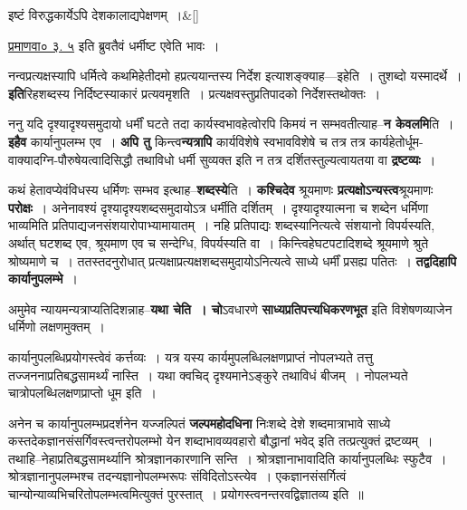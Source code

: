 \documentclass[article,12pt,a4paper]{memoir}
\begin{document}
	    
	    \stanza[\smallbreak]
	इष्टं विरुद्धकार्येऽपि देशकालाद्यपेक्षणम् ।\&[\smallbreak]


	
	    \pstart
	   \href{http://sarit.indology.info/?cref=pv.3.5}{प्रमाणवा० ३. ५} इति ब्रुवतैवं धर्मीष्ट एवेति भावः ।
	\pend
      

	  \pstart नन्वप्रत्यक्षस्यापि धर्मित्वे कथमिहेतीदमो हप्रत्ययान्तस्य निर्देश इत्याशङ्क्याह—इहेति । तुशब्दो यस्मादर्थे । \textbf{इति}रिहशब्दस्य निर्दिष्टस्याकारं प्रत्यवमृशति । प्रत्यक्षवस्तुप्रतिपादको निर्देशस्तथोक्तः ।
	\pend
      

	  \pstart ननु यदि दृश्यादृश्यसमुदायो धर्मीं घटते तदा कार्यस्वभावहेत्वोरपि किमयं न सम्भवतीत्याह--\textbf{न केवलमि}ति । \textbf{इहैव} कार्यानुपलम्भ एव । \textbf{अपि तु} किन्त्व\textbf{न्यत्रापि} कार्यविशेषे स्वभावविशेषे च तत्र तत्र कार्यहेतोर्धूम-वाक्यादग्नि-पौरुषेयत्वादिसिद्धौ तथाविधो धर्मी सुव्यक्त इति न तत्र दर्शितस्तुल्यत्वायतया वा \textbf{द्रष्टव्यः} ।
	\pend
      

	  \pstart कथं हेतावप्येवंविधस्य धर्मिणः सम्भव इत्थाह--\textbf{शब्दस्ये}ति । \textbf{कश्चिदेव} श्रूयमाणः \textbf{प्रत्यक्षोऽन्यस्त्व}श्रूयमाणः \textbf{परोक्षः} । अनेनावश्यं दृश्यादृश्यशब्दसमुदायोऽत्र धर्मीति दर्शितम् । दृश्यादृश्यात्मना च शब्देन धर्मिणा भाव्यमिति प्रतिपाद्यजनसंशयारोपाभ्यामायातम् । नहि प्र\leavevmode{}तिपाद्यः शब्दस्यानित्यत्वे संशयानो विपर्यस्यति, अर्थात् घटशब्द एव, श्रूयमाण एव च सन्देग्धि, विपर्यस्यति वा । किन्त्विहेघटपटादिशब्दे श्रूयमाणे श्रुते श्रोष्यमाणे च । ततस्तदनुरोधात् प्रत्यक्षाप्रत्यक्षशब्दसमुदायोऽनित्यत्वे साध्ये धर्मीं प्रसह्य पतितः । \textbf{तद्वदिहापि कार्यानुपलम्भे} ।
	\pend
      

	  \pstart अमुमेव न्यायमन्यत्राप्यतिदिशन्नाह--\textbf{यथा चेति । चो}ऽवधारणे \textbf{साध्यप्रतिपत्त्यधिकरणभूत} इति विशेषणव्याजेन धर्मिणो लक्षणमुक्तम् ।
	\pend
      

	  \pstart कार्यानुपलब्धिप्रयोगस्त्वेवं कर्त्तव्यः । यत्र यस्य कार्यमुपलब्धिलक्षणप्राप्तं नोपलभ्यते तत्तु तज्जननाप्रतिबद्धसामर्थ्यं नास्ति । यथा क्वचिद् दृश्यमानेऽङ्कुरे तथाविधं बीजम् । नोपलभ्यते चात्रोपलब्धिलक्षणप्राप्तो धूम इति ।
	\pend
      

	  \pstart अनेन च कार्यानुपलम्भप्रदर्शनेन यज्जल्पितं \textbf{जल्पमहोदधिना} निःशब्दे देशे शब्दमात्राभावे साध्ये कस्तदेकज्ञानसंसर्गिवस्त्वन्तरोपलम्भो येन शब्दाभावव्यवहारो बौद्धानां भवेद्  इति तत्प्रत्युक्तं द्रष्टव्यम् । तथाहि--नेहाप्रतिबद्धसामर्थ्यानि श्रोत्रज्ञानकारणानि सन्ति । श्रोत्रज्ञानाभावादिति कार्यानुपलब्धिः स्फुटैव । श्रोत्रज्ञानानुपलम्भश्च तदन्यज्ञानोपलम्भरूपः संविदितोऽस्त्येव । एकज्ञानसंसर्गित्वं चान्योन्याव्यभिचरितोपलम्भत्वमित्युक्तं पुरस्तात् । प्रयोगस्त्वनन्तरवद्विज्ञातव्य इति ॥
	\pend
	  \bigskip
	  \begingroup
	
\end{document}
